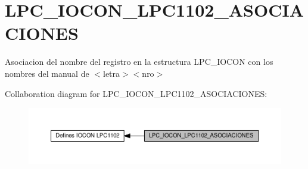 \hypertarget{group___l_p_c___i_o_c_o_n___l_p_c1102___a_s_o_c_i_a_c_i_o_n_e_s}{}\section{L\+P\+C\+\_\+\+I\+O\+C\+O\+N\+\_\+\+L\+P\+C1102\+\_\+\+A\+S\+O\+C\+I\+A\+C\+I\+O\+N\+ES}
\label{group___l_p_c___i_o_c_o_n___l_p_c1102___a_s_o_c_i_a_c_i_o_n_e_s}


Asociacion del nombre del registro en la estructura L\+P\+C\+\_\+\+I\+O\+C\+ON con los nombres del manual de $<$letra$>$$<$nro$>$  


Collaboration diagram for L\+P\+C\+\_\+\+I\+O\+C\+O\+N\+\_\+\+L\+P\+C1102\+\_\+\+A\+S\+O\+C\+I\+A\+C\+I\+O\+N\+ES\+:\nopagebreak
\begin{figure}[H]
\begin{center}
\leavevmode
\includegraphics[width=350pt]{group___l_p_c___i_o_c_o_n___l_p_c1102___a_s_o_c_i_a_c_i_o_n_e_s}
\end{center}
\end{figure}
